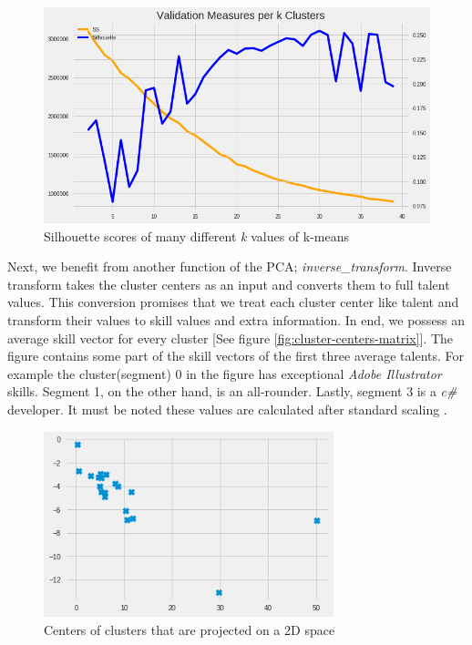  \begin{figure}[htp]
	\centering
	\includegraphics[width=\textwidth]{figures/PCASilhouette.png}
	\caption{Silhouette scores of many different \textit{k} values of k-means}
	\label{fig:pca-silhouette}
\end{figure}


Next, we benefit from another function of the PCA; \textit{inverse\_transform}. Inverse transform takes the cluster centers as an input and converts them to full talent values. This conversion promises that we treat each cluster center like talent and transform their values to skill values and extra information. In end, we possess an average skill vector for every cluster [See figure \ref{fig:cluster-centers-matrix}]. The figure contains some part of the skill vectors of the first three average talents. For example the cluster(segment) 0 in the figure has exceptional \textit{Adobe Illustrator} skills. Segment 1, on the other hand, is an all-rounder. Lastly, segment 3 is a \textit{c\#} developer.  It must be noted these values are calculated after standard scaling \cite{grus2019data}.

 \begin{figure}[htp]
	\centering
	\includegraphics[width=0.75\textwidth]{figures/KMeansCenters.png}
	\caption{Centers of clusters that are projected on a 2D space}
	\label{fig:kmeans-centers}
\end{figure}


